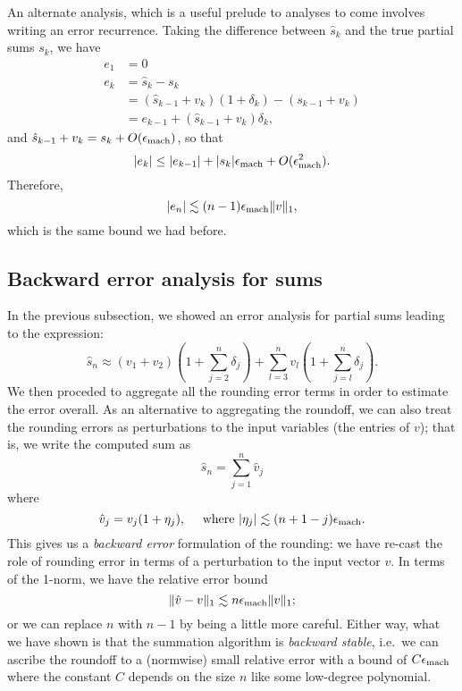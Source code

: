 \documentclass[12pt, leqno]{article} %
\begin{document}
An alternate analysis, which is a useful prelude to analyses to come
involves writing an error recurrence.
Taking the difference between $\hat{s}_k$ and the true partial sums $s_k$,
we have
\begin{align*}
  e_1 &= 0 \\
  e_{k} &= \hat{s}_k-s_k \\
        &= (\hat{s}_{k-1} + v_k)(1+\delta_k) - (s_{k-1} + v_k) \\
        &= e_{k-1} + (\hat{s}_{k-1} + v_k) \delta_k,
\end{align*}
and $\hat{s}_{k-1} + v_k = s_k + O(\epsilon_{\mathrm{mach}})$, so that
\[
  |e_{k}| \leq |e_{k-1}| + |s_k| \epsilon_{\mathrm{mach}} + O(\epsilon_{\mathrm{mach}}^2).
\]
Therefore,
\[
  |e_{n}| \lesssim (n-1) \epsilon_{\mathrm{mach}} \|v\|_1,
\]
which is the same bound we had before.

\subsection{Backward error analysis for sums}

In the previous subsection, we showed an error analysis for partial sums
leading to the expression:
\[
  \hat{s}_n \approx (v_1 + v_2) \left(1 + \sum_{j=2}^n \delta_j \right)
              + \sum_{l=3}^n v_l \left( 1 + \sum_{j=l}^n \delta_j \right).
\]
We then proceded to aggregate all the rounding error terms in order to
estimate the error overall.  As an alternative to aggregating the roundoff,
we can also treat the rounding errors as perturbations to the input
variables (the entries of $v$); that is, we write the computed sum as
\[
  \hat{s}_n = \sum_{j=1}^n \hat{v}_j
\]
where
\[
  \hat{v}_j = v_j (1+\eta_j), \quad
  \mbox{ where }|\eta_j| \lesssim (n+1-j) \epsilon_{\mathrm{mach}}.
\]
This gives us a {\em backward error} formulation of the rounding:
we have re-cast the role of rounding error in terms of a
perturbation to the input vector $v$.  In terms of the 1-norm,
we have the relative error bound
\[
  \|\hat{v}-v\|_1 \lesssim n \epsilon_{\mathrm{mach}} \|v\|_1;
\]
or we can replace $n$ with $n-1$ by being a little more careful.
Either way, what we have shown is that the summation algorithm
is {\em backward stable}, i.e.~we can ascribe the roundoff to
a (normwise) small relative error with a bound of $C \epsilon_{\mathrm{mach}}$
where the constant $C$ depends on the size $n$ like some low-degree
polynomial.
\end{document}
